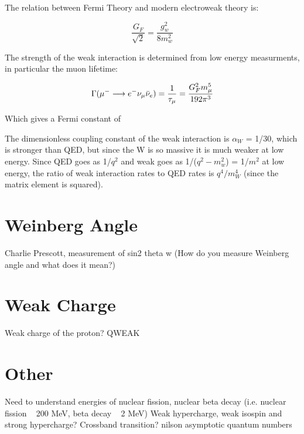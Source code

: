             
            The relation between Fermi Theory and modern electroweak theory is:
            
            \begin{equation}
                \frac{G_F}{\sqrt{2}} = \frac{g_w^2}{8m_w^2}
            \end{equation}
            
            
            The strength of the weak interaction is determined from low energy measurments, in particular the muon lifetime:
            
            \begin{equation}
                \Gamma(\mu^- \longrightarrow e^- \nu_{\mu} \Bar{\nu}_e) = \frac{1}{\tau_{\mu}} = \frac{G_F^2 m_{\mu}^5}{192 \pi^3}
            \end{equation}
            
            Which gives a Fermi constant of 
            
            The dimensionless coupling constant of the weak interaction is $\alpha_W$ = 1/30, which is stronger than QED, but since the W is so massive it is much weaker at low energy. Since QED goes as 1/$q^2$ and weak goes as 1/($q^2-m_w^2$) = 1/$m^2$ at low energy, the ratio of weak interaction rates to QED rates is $q^4/m_W^4$ (since the matrix element is squared). 
            
    \section{Weinberg Angle}
        Charlie Prescott, measurement of sin2 theta w (How do you measure Weinberg angle and what does it mean?)
        
        
    \section{Weak Charge}
         Weak charge of the proton?
         QWEAK
        
    \section{Other}
        Need to understand energies of nuclear fission, nuclear beta decay (i.e. nuclear fission ~ 200 MeV, beta decay ~ 2 MeV)
        Weak hypercharge, weak isospin and strong hypercharge?
        Crossband transition? 
        nilson asymptotic quantum numbers
       
